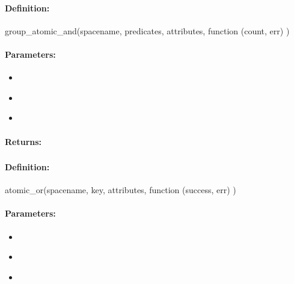 \paragraph{Definition:}
\begin{javascriptcode}
group_atomic_and(spacename, predicates, attributes, function (count, err) {})
\end{javascriptcode}
\paragraph{Parameters:}
\begin{itemize}[noitemsep]
\item {}\\

\item {}\\

\item {}\\

\end{itemize}

\paragraph{Returns:}


\pagebreak
\subsubsection{}
\label{api:nodejs:atomic_or}


\paragraph{Definition:}
\begin{javascriptcode}
atomic_or(spacename, key, attributes, function (success, err) {})
\end{javascriptcode}
\paragraph{Parameters:}
\begin{itemize}[noitemsep]
\item {}\\

\item {}\\

\item {}\\

\end{itemize}

